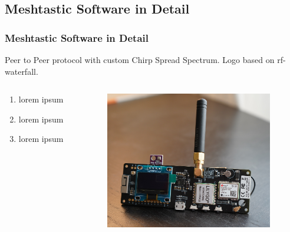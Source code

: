 \documentclass[aspectratio=169]{beamer}
\begin{document}
\subsection{Meshtastic Software in Detail}
\begin{frame}[fragile]
  \frametitle{Meshtastic Software in Detail}
  Peer to Peer protocol with custom Chirp Spread Spectrum.
  Logo based on rf-waterfall.
  \vfill{}
  \begin{columns}[]
    \begin{column}[T]{0.45\paperwidth}
      \begin{enumerate}%
        \item{lorem ipsum}
        \item{lorem ipsum}
        \item{lorem ipsum}
      \end{enumerate}
    \end{column}
    \begin{column}[T]{0.45\paperwidth}
      \includegraphics[height=6cm,keepaspectratio]{images/tbeam.jpg}
    \end{column}
  \end{columns}
\end{frame}
\end{document}
